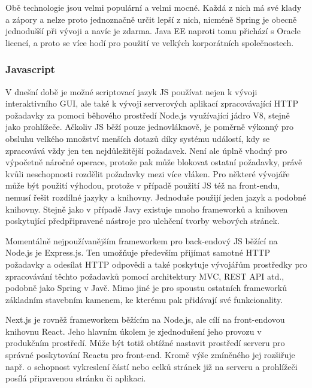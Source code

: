 \begin{itemize}
\begin{itemize}
		Obě technologie jsou velmi populární a velmi mocné.
		Každá z nich má své klady a zápory a nelze proto jednoznačně určit lepší z nich, nicméně Spring je obecně jednodušší při
		vývoji a navíc je zdarma.
		Java EE naproti tomu přichází s Oracle licencí, a proto se více hodí pro použití ve velkých korporátních
		společnostech. \cite{java_ee_vs_spring}

		\subsubsection{Javascript}

		V dnešní době je možné scriptovací jazyk \ac{JS} používat nejen k vývoji interaktivního \Ac{GUI},
		ale také k vývoji serverových aplikací zpracovávající \Ac{HTTP} požadavky za pomoci běhového prostředí Node.js
		využívající jádro V8, stejně jako prohlížeče. \cite{express_node_introduction}
		Ačkoliv \ac{JS} běží pouze jednovláknově, je poměrně výkonný pro obsluhu velkého množství menších dotazů díky
		systému událostí, kdy se zpracovává vždy jen ten nejdůležitější požadavek.
		Není ale úplně vhodný pro výpočetně náročné operace, protože pak může blokovat ostatní požadavky, právě kvůli
		neschopnosti rozdělit požadavky mezi více vláken. \cite{js_eventloop}
		Pro některé vývojáře může být použití výhodou, protože v případě použití \ac{JS} též na front-endu,
		nemusí řešit rozdílné jazyky a knihovny.
		Jednoduše použijí jeden jazyk a podobné knihovny.
		Stejně jako v případě Javy existuje mnoho frameworků a knihoven poskytující předpřipravené nástroje pro ulehčení
		tvorby webových stránek.

		Momentálně nejpoužívanějším frameworkem pro back-endový \ac{JS} běžící na Node.js je Express.js. \cite{state_of_js_2020}
		Ten umožňuje především přijímat samotné \Ac{HTTP} požadavky a odesílat \Ac{HTTP} odpovědi a také poskytuje vývojářům
		prostředky pro zpracovávání těchto požadavků pomocí architektury \Ac{MVC}, \Ac{REST} API atd., podobně
		jako Spring v Javě.
		Mimo jiné je pro spoustu ostatních frameworků základním stavebním kamenem, ke kterému pak přidávají
		své funkcionality. \cite{express_node_introduction}

		Next.js je rovněž frameworkem běžícím na Node.js, ale cílí na front-endovou knihovnu React.
		Jeho hlavním úkolem je zjednodušení jeho provozu v produkčním prostředí.
		Může být totiž obtížné nastavit prostředí serveru pro správné poskytování Reactu pro front-end.
		Kromě výše zmíněného jej rozšiřuje např. o schopnost vykreslení částí nebo celků stránek již na serveru a
		prohlížeči posílá připravenou stránku či aplikaci. \cite{create_nextjs_app}


\end{itemize}
\end{itemize}

